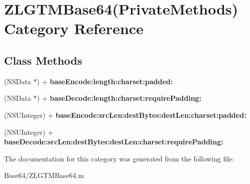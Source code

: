 \hypertarget{category_z_l_g_t_m_base64_07_private_methods_08}{\section{Z\+L\+G\+T\+M\+Base64(Private\+Methods) Category Reference}
\label{category_z_l_g_t_m_base64_07_private_methods_08}
}
\subsection*{Class Methods}
\begin{DoxyCompactItemize}
\item 
\hypertarget{category_z_l_g_t_m_base64_07_private_methods_08_a5fc4c3bf3f30c7dfd9940d6446f8b854}{(N\+S\+Data $\ast$) + {\bfseries base\+Encode\+:length\+:charset\+:padded\+:}}\label{category_z_l_g_t_m_base64_07_private_methods_08_a5fc4c3bf3f30c7dfd9940d6446f8b854}

\item 
\hypertarget{category_z_l_g_t_m_base64_07_private_methods_08_aa48d690bcbc7cc31f4ceb8be724344aa}{(N\+S\+Data $\ast$) + {\bfseries base\+Decode\+:length\+:charset\+:require\+Padding\+:}}\label{category_z_l_g_t_m_base64_07_private_methods_08_aa48d690bcbc7cc31f4ceb8be724344aa}

\item 
\hypertarget{category_z_l_g_t_m_base64_07_private_methods_08_ac56c08867c5eb64ef56a02461668d771}{(N\+S\+U\+Integer) + {\bfseries base\+Encode\+:src\+Len\+:dest\+Bytes\+:dest\+Len\+:charset\+:padded\+:}}\label{category_z_l_g_t_m_base64_07_private_methods_08_ac56c08867c5eb64ef56a02461668d771}

\item 
\hypertarget{category_z_l_g_t_m_base64_07_private_methods_08_a85d6cfd028d395197fcc1b453e4ae583}{(N\+S\+U\+Integer) + {\bfseries base\+Decode\+:src\+Len\+:dest\+Bytes\+:dest\+Len\+:charset\+:require\+Padding\+:}}\label{category_z_l_g_t_m_base64_07_private_methods_08_a85d6cfd028d395197fcc1b453e4ae583}

\end{DoxyCompactItemize}


The documentation for this category was generated from the following file\+:\begin{DoxyCompactItemize}
\item 
Base64/Z\+L\+G\+T\+M\+Base64.\+m\end{DoxyCompactItemize}
